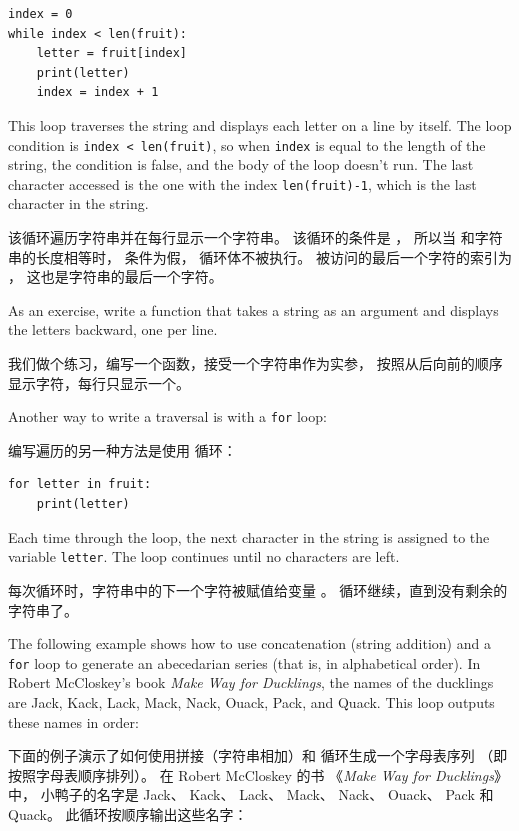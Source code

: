 \begin{lstlisting}
index = 0
while index < len(fruit):
    letter = fruit[index]
    print(letter)
    index = index + 1
\end{lstlisting}

%
This loop traverses the string and displays each letter on a line by
itself.  The loop condition is {\tt index < len(fruit)}, so
when {\tt index} is equal to the length of the string, the
condition is false, and the body of the loop doesn't run.  The
last character accessed is the one with the index {\tt len(fruit)-1},
which is the last character in the string.

该循环遍历字符串并在每行显示一个字符串。 该循环的条件是 ， 所以当  和字符串的长度相等时， 条件为假， 循环体不被执行。 被访问的最后一个字符的索引为 ， 这也是字符串的最后一个字符。

As an exercise, write a function that takes a string as an argument
and displays the letters backward, one per line.

我们做个练习，编写一个函数，接受一个字符串作为实参，
按照从后向前的顺序显示字符，每行只显示一个。

Another way to write a traversal is with a {\tt for} loop:

编写遍历的另一种方法是使用  循环：

\begin{lstlisting}
for letter in fruit:
    print(letter)
\end{lstlisting}

%
Each time through the loop, the next character in the string is assigned
to the variable {\tt letter}.  The loop continues until no characters are
left.
  

每次循环时，字符串中的下一个字符被赋值给变量  。 循环继续，直到没有剩余的字符串了。

The following example shows how to use concatenation (string addition)
and a {\tt for} loop to generate an abecedarian series (that is, in
alphabetical order).  In Robert McCloskey's book {\em Make
Way for Ducklings}, the names of the ducklings are Jack, Kack, Lack,
Mack, Nack, Ouack, Pack, and Quack.  This loop outputs these names in
order:

下面的例子演示了如何使用拼接（字符串相加）和  循环生成一个字母表序列 （即按照字母表顺序排列）。 在 Robert McCloskey 的书 《{\em Make Way for Ducklings}》 中， 小鸭子的名字是 Jack、 Kack、 Lack、 Mack、 Nack、 Ouack、 Pack 和 Quack。 此循环按顺序输出这些名字：


